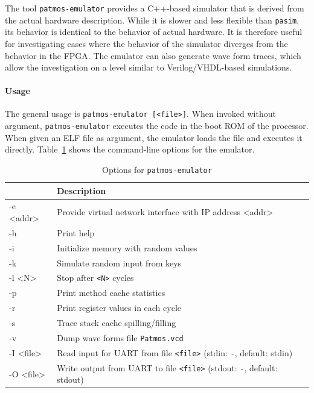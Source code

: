 \documentclass[a4paper,fontsize=10pt,twoside,DIV15,BCOR12mm,headinclude=true,footinclude=false,pagesize,bibtotoc]{scrbook}
\begin{document}
The tool \texttt{patmos-emulator} provides a C++-based simulator that
is derived from the actual hardware description. While it is slower
and less flexible than \texttt{pasim}, its behavior is identical to
the behavior of actual hardware. It is therefore useful for
investigating cases where the behavior of the simulator diverges from
the behavior in the FPGA. The emulator can also generate wave form
traces, which allow the investigation on a level similar to
Verilog/VHDL-based simulations.

\paragraph{Usage} 

The general usage is \texttt{patmos-emulator [<file>]}. When invoked
without argument, \texttt{patmos-emulator} executes the code in the
boot ROM of the processor. When given an ELF file as argument, the
emulator loads the file and executes it
directly. Table~\ref{tab:emulopts} shows the command-line options for
the emulator.

\begin{table}
  \centering
  \caption{Options for \texttt{patmos-emulator}}
  \label{tab:emulopts}
  \begin{tabular}{>{\ttfamily}l<{}p{}}
    \toprule
    \multicolumn{1}{l}{Option} & Description \\
    \midrule
    -e <addr>     & Provide virtual network interface with IP address <addr> \\
    -h            & Print help \\
    -i            & Initialize memory with random values \\
    -k            & Simulate random input from keys \\
    -l <N>        & Stop after \texttt{<N>} cycles \\
    -p            & Print method cache statistics \\
    -r            & Print register values in each cycle \\
    -s            & Trace stack cache spilling/filling \\
    -v            & Dump wave forms file \texttt{Patmos.vcd} \\
    -I <file>     & Read input for UART from file \texttt{<file>} (stdin: \texttt{-}, default: stdin) \\
    -O <file>     & Write output from UART to file \texttt{<file>} (stdout: \texttt{-}, default: stdout) \\
    \bottomrule
  \end{tabular}
\end{table}
\end{document}
